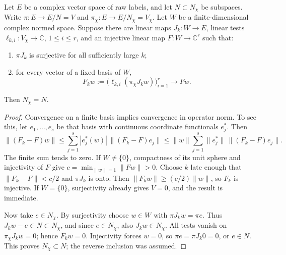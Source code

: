 \begin{proposition}
\label{ex-no-new-null}
Let \(E\) be a complex vector space of raw labels, and let
\(N\subset N_\chi\) be subspaces. Write
\(\pi:E\to E/N=V\) and \(\pi_\chi:E\to E/N_\chi=V_\chi\).
Let \(W\) be a finite-dimensional complex normed space. Suppose there
are linear maps \(J_k:W\to E\), linear tests
\(\ell_{k,i}:V_\chi\to\mathbb C\), \(1\le i\le r\), and an
injective linear map \(F:W\to\mathbb C^r\) such that:
\begin{enumerate}
\item \(\pi J_k\) is surjective for all sufficiently large \(k\);
\item for every vector of a fixed basis of \(W\),
\[
 F_k w:=\bigl(\ell_{k,i}(\pi_\chi J_kw)\bigr)_{i=1}^r
 \longrightarrow Fw.
\]
\end{enumerate}
Then \(N_\chi=N\).
\end{proposition}
\begin{proof}
Convergence on a finite basis implies convergence in operator norm.
To see this, let \(e_1,\ldots,e_s\) be that basis with continuous
coordinate functionals \(e_j^*\). Then
\[
 \|(F_k-F)w\|
 \le\sum_{j=1}^s|e_j^*(w)|\,\|(F_k-F)e_j\|
 \le\|w\|\sum_{j=1}^s\|e_j^*\|\,\|(F_k-F)e_j\|.
\]
The finite sum tends to zero. If \(W\ne\{0\}\), compactness of its
unit sphere and injectivity of \(F\) give
\(c=\min_{\|w\|=1}\|Fw\|>0\). Choose \(k\) late enough that
\(\|F_k-F\|<c/2\) and \(\pi J_k\) is onto. Then
\(\|F_kw\|\ge(c/2)\|w\|\), so \(F_k\) is injective.
If \(W=\{0\}\), surjectivity already gives \(V=0\), and the result
is immediate.

Now take \(e\in N_\chi\). By surjectivity choose \(w\in W\) with
\(\pi J_kw=\pi e\). Thus \(J_kw-e\in N\subset N_\chi\), and since
\(e\in N_\chi\), also \(J_kw\in N_\chi\). All tests vanish on
\(\pi_\chi J_kw=0\); hence \(F_kw=0\). Injectivity forces \(w=0\),
so \(\pi e=\pi J_k0=0\), or \(e\in N\). This proves
\(N_\chi\subset N\); the reverse inclusion was assumed.
\end{proof}

